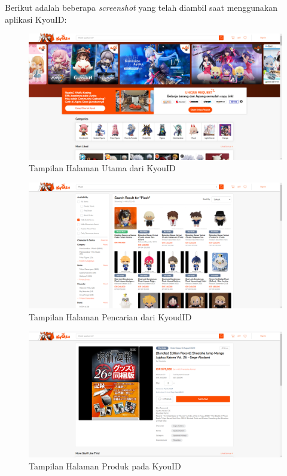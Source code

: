 \documentclass[a4paper]{article}
\begin{document}
\begin{itemize}
\begin{enumerate}
        Berikut adalah beberapa \textit{screenshot} yang telah diambil saat menggunakan aplikasi KyouID:

        \begin{figure}[h]
            \centering
            \includegraphics[scale=0.25]{images/ss kyouid/Homepage KyouID.png}
            \caption{Tampilan Halaman Utama dari KyouID}
        \end{figure}
        \newpage
        \begin{figure}[h]
            \centering
            \includegraphics[scale=0.25]{images/ss kyouid/Search Page KyouID.png}
            \caption{Tampilan Halaman Pencarian dari KyoudID}
        \end{figure}

        \begin{figure}[h]
            \centering
            \includegraphics[scale=0.25]{images/ss kyouid/Products Page KyouID.png}
            \caption{Tampilan Halaman Produk pada KyouID}
        \end{figure}


\end{enumerate}
\end{itemize}
\end{document}
